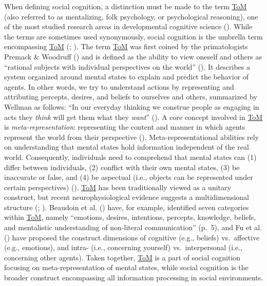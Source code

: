 \documentclass[
]{scrbook}
\begin{document}
When defining social cognition, a distinction must be made to the term \hyperref[acronyms_ToM]{ToM} (also referred to as mentalizing, folk psychology, or psychological reasoning), one of the most studied research areas in developmental cognitive science (). While the terms are sometimes used synonymously, social cognition is the umbrella term encompassing \hyperref[acronyms_ToM]{ToM} (; ). The term \hyperref[acronyms_ToM]{ToM} was first coined by the primatologists Premack \& Woodruff () and is defined as the ability to view oneself and others as ``rational subjects with individual perspectives on the world'' (). It describes a system organized around mental states to explain and predict the behavior of agents. In other words, we try to understand actions by representing and attributing percepts, desires, and beliefs to ourselves and others, summarized by Wellman as follows: ``In our everyday thinking we construe people as engaging in acts they \emph{think} will get them what they \emph{want}'' (). A core concept involved in \hyperref[acronyms_ToM]{ToM} is \emph{meta-representation}: representing the content and manner in which agents represent the world from their perspective (). Meta-representational abilities rely on understanding that mental states hold information independent of the real world. Consequently, individuals need to comprehend that mental states can (1) differ between individuals, (2) conflict with their own mental states, (3) be inaccurate or false, and (4) be aspectual (i.e., objects can be represented under certain perspectives) (). \hyperref[acronyms_ToM]{ToM} has been traditionally viewed as a unitary construct, but recent neurophysiological evidence suggests a multidimensional structure (; ). Beaudoin et al. () have, for example, identified seven categories within \hyperref[acronyms_ToM]{ToM}, namely ``emotions, desires, intentions, percepts, knowledge, beliefs, and mentalistic understanding of non-literal communication'' (p.~5), and Fu et al. () have proposed the construct dimensions of cognitive (e.g., beliefs) vs.~affective (e.g., emotions), and intra- (i.e., concerning yourself) vs.~interpersonal (i.e., concerning other agents). Taken together, \hyperref[acronyms_ToM]{ToM} is a part of social cognition focusing on meta-representation of mental states, while social cognition is the broader construct encompassing all information processing in social environments.
\end{document}
